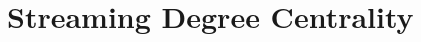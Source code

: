 \documentclass[10]{report}
\newtheorem{theorem}{Theorem}[section]
\newcommand{\algoname}[1]{\textnormal{\textsc{#1}}}
\newcommand{\med}{\mathrm{median}}
\begin{document}
%
%
%
%
%

\section{Streaming Degree Centrality} \label{dc:sec:dc}


\end{document}
